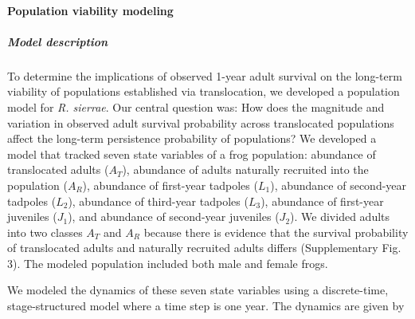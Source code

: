 \documentclass[
  letterpaper,
  DIV=11,
  numbers=noendperiod]{scrartcl}
\let\oldparagraph\paragraph
\renewcommand{\paragraph}[1]{\oldparagraph{#1}\mbox{}}
\let\oldsubparagraph\subparagraph
\renewcommand{\subparagraph}[1]{\oldsubparagraph{#1}\mbox{}}
\begin{document}
\paragraph{Population viability
modeling}\label{population-viability-modeling}

\subparagraph{Model description}\label{model-description}

To determine the implications of observed 1-year adult survival on the
long-term viability of populations established via translocation, we
developed a population model for \emph{R. sierrae}. Our central question
was: How does the magnitude and variation in observed adult survival
probability across translocated populations affect the long-term
persistence probability of populations? We developed a model that
tracked seven state variables of a frog population: abundance of
translocated adults (\(A_T\)), abundance of adults naturally recruited
into the population (\(A_R\)), abundance of first-year tadpoles
(\(L_1\)), abundance of second-year tadpoles (\(L_2\)), abundance of
third-year tadpoles (\(L_3\)), abundance of first-year juveniles
(\(J_1\)), and abundance of second-year juveniles (\(J_2\)). We divided
adults into two classes \(A_T\) and \(A_R\) because there is evidence
that the survival probability of translocated adults and naturally
recruited adults differs (Supplementary Fig. 3). The modeled population
included both male and female frogs.

We modeled the dynamics of these seven state variables using a
discrete-time, stage-structured model where a time step is one year. The
dynamics are given by
\end{document}
